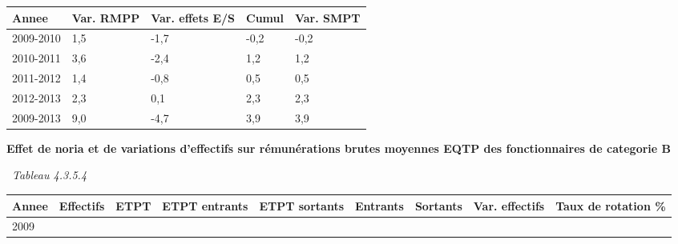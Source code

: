 \begin{longtable}[]{@{}lllll@{}}
\toprule
Annee & Var. RMPP & Var. effets E/S & Cumul & Var. SMPT\tabularnewline
\midrule
\endhead
2009-2010 & 1,5 & -1,7 & -0,2 & -0,2\tabularnewline
2010-2011 & 3,6 & -2,4 & 1,2 & 1,2\tabularnewline
2011-2012 & 1,4 & -0,8 & 0,5 & 0,5\tabularnewline
2012-2013 & 2,3 & 0,1 & 2,3 & 2,3\tabularnewline
2009-2013 & 9,0 & -4,7 & 3,9 & 3,9\tabularnewline
\bottomrule
\end{longtable}

\textbf{Effet de noria et de variations d'effectifs sur rémunérations
brutes moyennes EQTP des fonctionnaires de categorie B}

~\emph{Tableau 4.3.5.4}

\begin{longtable}[]{@{}lllllllll@{}}
\toprule
\begin{minipage}[b]{0.05\columnwidth}\raggedright
Annee\strut
\end{minipage} & \begin{minipage}[b]{0.08\columnwidth}\raggedright
Effectifs\strut
\end{minipage} & \begin{minipage}[b]{0.04\columnwidth}\raggedright
ETPT\strut
\end{minipage} & \begin{minipage}[b]{0.10\columnwidth}\raggedright
ETPT entrants\strut
\end{minipage} & \begin{minipage}[b]{0.10\columnwidth}\raggedright
ETPT sortants\strut
\end{minipage} & \begin{minipage}[b]{0.07\columnwidth}\raggedright
Entrants\strut
\end{minipage} & \begin{minipage}[b]{0.07\columnwidth}\raggedright
Sortants\strut
\end{minipage} & \begin{minipage}[b]{0.11\columnwidth}\raggedright
Var. effectifs\strut
\end{minipage} & \begin{minipage}[b]{0.14\columnwidth}\raggedright
Taux de rotation \%\strut
\end{minipage}\tabularnewline
\midrule
\endhead
\begin{minipage}[t]{0.05\columnwidth}\raggedright
2009\strut
\end{minipage} & \begin{minipage}[t]{0.08\columnwidth}\raggedright

\end{minipage}
\end{longtable}
